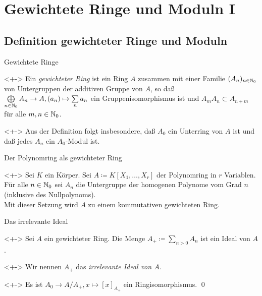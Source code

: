 \section{Gewichtete Ringe und Moduln I}

\subsection{Definition gewichteter Ringe und Moduln}

\begin{frame}{Gewichtete Ringe}
	\begin{definition}<+->
		Ein \emph{gewichteter Ring} ist ein Ring \(A\) zusammen mit einer
		Familie \((A_n)_{n \in \mathbb N_0}\) von Untergruppen der additiven
		Gruppe von \(A\), so daß
		\(\bigoplus\limits_{n \in \mathbb N_0} A_n \to A, (a_n) \mapsto
		\sum\limits_n a_n\) ein Gruppenisomorphismus ist und
		\(A_m A_n \subset A_{n + m}\) für alle \(m, n \in \mathbb N_0\).
	\end{definition}
	\begin{visibleenv}<+->
		Aus der Definition folgt insbesondere, daß \(A_0\) ein Unterring
		von \(A\) ist und daß jedes \(A_n\) ein \(A_0\)-Modul ist.
	\end{visibleenv}
\end{frame}

\begin{frame}{Der Polynomring als gewichteter Ring}
	\begin{example}<+->
		Sei \(K\) ein Körper. Sei \(A \coloneqq K[X_1, \dotsc, X_r]\) der
		Polynomring in \(r\) Variablen. 
		\\
		Für alle \(n \in \mathbb N_0\) sei \(A_n\) die Untergruppe der homogenen
		Polynome vom Grad \(n\) (inklusive des Nullpolynoms).
		\\
		Mit dieser Setzung wird \(A\) zu einem kommutativen gewichteten Ring.
	\end{example}
\end{frame}

\begin{frame}{Das irrelevante Ideal}
	\begin{visibleenv}<+->
		Sei \(A\) ein gewichteter Ring. Die Menge
		\(A_+ \coloneqq \sum\limits_{n > 0} A_n\) ist ein Ideal von \(A\).
	\end{visibleenv}
	\begin{notation}<+->
		Wir nennen \(A_+\) das \emph{irrelevante Ideal von \(A\)}.
	\end{notation}
	\begin{proposition}<+->
		Es ist \(A_0 \to A/A_+, x \mapsto [x]_{A_+}\) ein Ringisomorphismus.
		\qed
	\end{proposition}
\end{frame}

